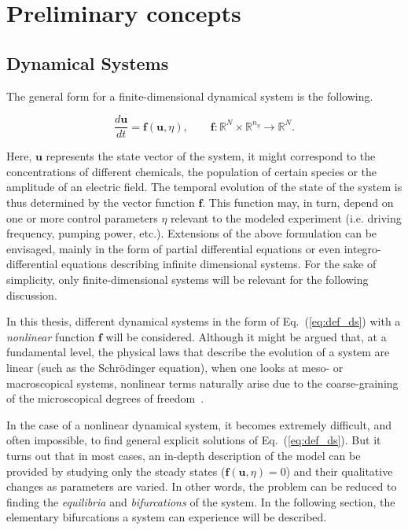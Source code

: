 \chapter{Preliminary concepts}

\label{ch:preliminary}

\section{Dynamical Systems}


The general form for a finite-dimensional dynamical system is the following.

\begin{equation}
    \dfrac{d\bm{u}}{dt} = \bm{f}(\bm{u}, \eta), \qquad \bm{f} : \mathbb{R}^N \times \mathbb{R}^{n_\eta} \to \mathbb{R}^N.
    \label{eq:def_ds}
\end{equation}

Here, $\bm{u}$ represents the state vector of the system, it might correspond to the
concentrations of different chemicals, the population of certain species or the amplitude
of an electric field. The temporal evolution of the state of the system is thus determined by 
the vector function $\bm{f}$. This function may, in turn, depend on one or more control
parameters $\eta$ relevant to the modeled experiment (i.e. driving frequency, pumping power, etc.).
Extensions of the above formulation can be envisaged, mainly in the form of partial differential equations
or even integro-differential equations describing infinite dimensional systems. For the sake of simplicity,
only finite-dimensional systems will be relevant for the following discussion.

In this thesis, different dynamical systems in the form of Eq.~(\ref{eq:def_ds}) with a {\em nonlinear} function
$\bm{f}$ will be considered. Although it might be argued that, at a fundamental level, the physical laws
that describe the evolution of a system are linear (such as the Schrödinger equation), when one looks at meso- or macroscopical
systems, nonlinear terms naturally arise due to the coarse-graining of the microscopical degrees of freedom~\cite{kardar2007statistical}.


In the case of a nonlinear dynamical system, it becomes extremely difficult, and often impossible, to find
general explicit solutions of Eq.~(\ref{eq:def_ds}). But it turns out that in most cases, an in-depth
description of the model can be provided by studying only the steady states ($\bm{f}(\bm{u}, \eta) = 0$) and their qualitative changes as parameters 
are varied. In other words, the problem can be reduced to finding the {\em equilibria} and {\em bifurcations} of the system.
In the following section, the elementary bifurcations a system can experience will be described.

